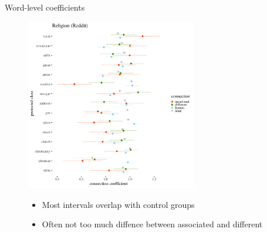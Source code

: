 \documentclass[10pt,ignorenonframetext,x11names, dvipsnames, bibspacing,natbib]{beamer}
\begin{document}
\begin{frame}{Word-level coefficients}
\protect\hypertarget{word-level-coefficients}{}

\begin{figure}[!htb]\centering
  \begin{minipage}{0.55\textwidth}
\includegraphics[width=7.5cm]{../images/visReligionReddit.png}
\end{minipage}
\begin{minipage}{0.4\textwidth}\footnotesize

\vspace{-4cm}

   \begin{itemize}
   \item Most intervals overlap with control groups
   \item Often not too much diffence between associated and different
   \end{itemize}
   \end{minipage}
\end{figure}

\end{frame}
\end{document}
